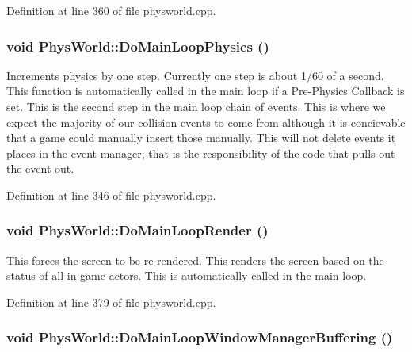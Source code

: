 Definition at line 360 of file physworld.cpp.\hypertarget{classPhysWorld_a994d7d8c4a9a0c003c3e7d89be7b399b}{
\subsubsection[{DoMainLoopPhysics}]{\setlength{\rightskip}{0pt plus 5cm}void PhysWorld::DoMainLoopPhysics ()}}
\label{db/df5/classPhysWorld_a994d7d8c4a9a0c003c3e7d89be7b399b}


Increments physics by one step. Currently one step is about 1/60 of a second. This function is automatically called in the main loop if a Pre-\/Physics Callback is set. This is the second step in the main loop chain of events. This is where we expect the majority of our collision events to come from although it is concievable that a game could manually insert those manually. This will not delete events it places in the event manager, that is the responsibility of the code that pulls out the event out. 

Definition at line 346 of file physworld.cpp.\hypertarget{classPhysWorld_a8f33541d67164a2452e568443e9905be}{
\subsubsection[{DoMainLoopRender}]{\setlength{\rightskip}{0pt plus 5cm}void PhysWorld::DoMainLoopRender ()}}
\label{db/df5/classPhysWorld_a8f33541d67164a2452e568443e9905be}


This forces the screen to be re-\/rendered. This renders the screen based on the status of all in game actors. This is automatically called in the main loop. 

Definition at line 379 of file physworld.cpp.\hypertarget{classPhysWorld_ae81bab7f314d98f7b787c508e60c9c9a}{
\subsubsection[{DoMainLoopWindowManagerBuffering}]{\setlength{\rightskip}{0pt plus 5cm}void PhysWorld::DoMainLoopWindowManagerBuffering ()}}
\label{db/df5/classPhysWorld_ae81bab7f314d98f7b787c508e60c9c9a}


